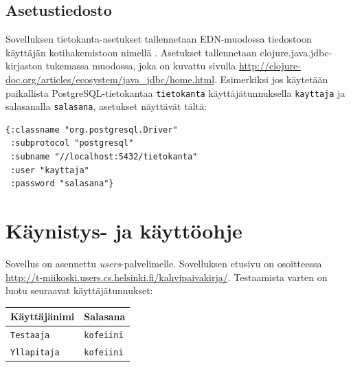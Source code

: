\documentclass[a4paper,titlepage]{article}
\begin{document}
\subsection{Asetustiedosto}
\label{sec:asetustiedosto}

Sovelluksen tietokanta-asetukset tallennetaan EDN-muodossa tiedostoon
käyttäjän kotihakemistoon nimellä
. Asetukset tallennetaan
clojure.java.jdbc-kirjaston tukemassa muodossa, joka on kuvattu
sivulla
\url{http://clojure-doc.org/articles/ecosystem/java_jdbc/home.html}. Esimerkiksi
jos käytetään paikallista PostgreSQL-tietokantaa \texttt{tietokanta}
käyttäjätunnuksella \texttt{kayttaja} ja salasanalla
\texttt{salasana}, asetukset näyttävät tältä:

\begin{lstlisting}[basicstyle=\ttfamily]
{:classname "org.postgresql.Driver"
 :subprotocol "postgresql"
 :subname "//localhost:5432/tietokanta"
 :user "kayttaja"
 :password "salasana"}
\end{lstlisting}

\section{Käynistys- ja käyttöohje}

Sovellus on asennettu \emph{users}-palvelimelle. Sovelluksen etusivu on osoitteessa \url{http://t-miikoski.users.cs.helsinki.fi/kahvipaivakirja/}. Testaamista varten on luotu seuraavat käyttäjätunnukset:

\begin{center}
\begin{tabularx}{\textwidth}{|X|X|}
\hline
Käyttäjänimi & Salasana \\
\hline
\texttt{Testaaja} & \texttt{kofeiini} \\
\texttt{Yllapitaja} & \texttt{kofeiini} \\
\hline
\end{tabularx}
\end{center}
\end{document}
